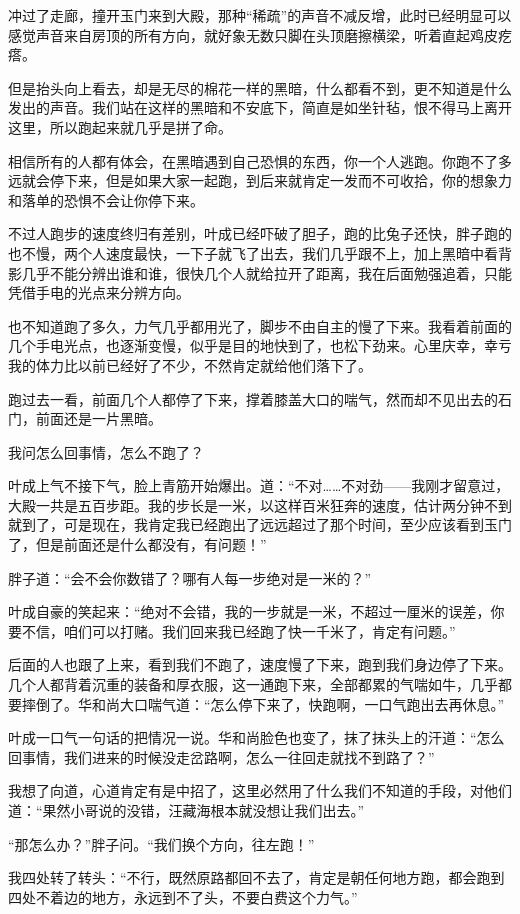 冲过了走廊，撞开玉门来到大殿，那种“稀疏”的声音不减反增，此时已经明显可以感觉声音来自房顶的所有方向，就好象无数只脚在头顶磨擦横梁，听着直起鸡皮疙瘩。

但是抬头向上看去，却是无尽的棉花一样的黑暗，什么都看不到，更不知道是什么发出的声音。我们站在这样的黑暗和不安底下，简直是如坐针毡，恨不得马上离开这里，所以跑起来就几乎是拼了命。

相信所有的人都有体会，在黑暗遇到自己恐惧的东西，你一个人逃跑。你跑不了多远就会停下来，但是如果大家一起跑，到后来就肯定一发而不可收拾，你的想象力和落单的恐惧不会让你停下来。

不过人跑步的速度终归有差别，叶成已经吓破了胆子，跑的比兔子还快，胖子跑的也不慢，两个人速度最快，一下子就飞了出去，我们几乎跟不上，加上黑暗中看背影几乎不能分辨出谁和谁，很快几个人就给拉开了距离，我在后面勉强追着，只能凭借手电的光点来分辨方向。

也不知道跑了多久，力气几乎都用光了，脚步不由自主的慢了下来。我看着前面的几个手电光点，也逐渐变慢，似乎是目的地快到了，也松下劲来。心里庆幸，幸亏我的体力比以前已经好了不少，不然肯定就给他们落下了。

跑过去一看，前面几个人都停了下来，撑着膝盖大口的喘气，然而却不见出去的石门，前面还是一片黑暗。

我问怎么回事情，怎么不跑了？

叶成上气不接下气，脸上青筋开始爆出。道：“不对……不对劲——我刚才留意过，大殿一共是五百步距。我的步长是一米，以这样百米狂奔的速度，估计两分钟不到就到了，可是现在，我肯定我已经跑出了远远超过了那个时间，至少应该看到玉门了，但是前面还是什么都没有，有问题！”

胖子道：“会不会你数错了？哪有人每一步绝对是一米的？”

叶成自豪的笑起来：“绝对不会错，我的一步就是一米，不超过一厘米的误差，你要不信，咱们可以打赌。我们回来我已经跑了快一千米了，肯定有问题。”

后面的人也跟了上来，看到我们不跑了，速度慢了下来，跑到我们身边停了下来。几个人都背着沉重的装备和厚衣服，这一通跑下来，全部都累的气喘如牛，几乎都要摔倒了。华和尚大口喘气道：“怎么停下来了，快跑啊，一口气跑出去再休息。”

叶成一口气一句话的把情况一说。华和尚脸色也变了，抹了抹头上的汗道：“怎么回事情，我们进来的时候没走岔路啊，怎么一往回走就找不到路了？”

我想了向道，心道肯定有是中招了，这里必然用了什么我们不知道的手段，对他们道：“果然小哥说的没错，汪藏海根本就没想让我们出去。”

“那怎么办？”胖子问。“我们换个方向，往左跑！”

我四处转了转头：“不行，既然原路都回不去了，肯定是朝任何地方跑，都会跑到四处不着边的地方，永远到不了头，不要白费这个力气。”


